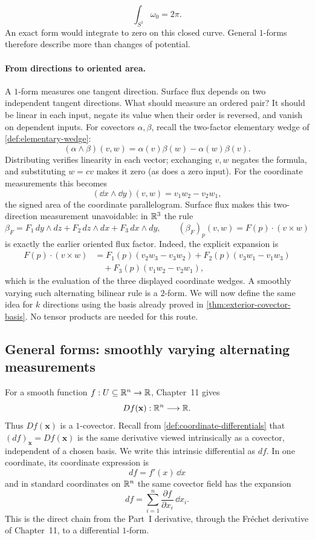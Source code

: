 \[
\int_{S^1}\omega_0=2\pi.
\]
 An exact form would integrate to zero
on this closed curve. General $1$-forms therefore describe more than
changes of potential.

\paragraph{From directions to oriented area.}
A $1$-form measures one tangent direction. Surface flux depends on two
independent tangent directions. What should measure an ordered pair?
It should be linear in each input, negate its value when their order is
reversed, and vanish on dependent inputs. For covectors $\alpha,\beta$,
recall the two-factor elementary wedge of \cref{def:elementary-wedge}:
\[
(\alpha\wedge\beta)(v,w)
=\alpha(v)\beta(w)-\alpha(w)\beta(v).
\]
Distributing verifies linearity in each vector; exchanging $v,w$ negates
the formula, and substituting $w=cv$ makes it zero (as does a zero input).
For the coordinate measurements this becomes
\[
(\dd x\wedge\dd y)(v,w)=v_1w_2-v_2w_1,
\]
the signed area of the coordinate parallelogram. Surface flux makes
this two-direction measurement unavoidable: in $\mathbb{R}^3$ the rule
\[
\beta_F=F_1\,dy\wedge dz+F_2\,dz\wedge dx+F_3\,dx\wedge dy,
\qquad (\beta_F)_p(v,w)=F(p)\cdot(v\times w)
\]
is exactly the earlier oriented flux factor. Indeed, the explicit expansion is
\[
\begin{aligned}
F(p)\cdot(v\times w)
&=F_1(p)(v_2w_3-v_3w_2)+F_2(p)(v_3w_1-v_1w_3)\\
&\quad+F_3(p)(v_1w_2-v_2w_1),
\end{aligned}
\]
which is the evaluation of the three displayed coordinate wedges.
A smoothly varying such
alternating bilinear rule is a $2$-form. We will now define the same idea
for $k$ directions using the basis already proved in
\cref{thm:exterior-covector-basis}. No tensor products are needed for this route.

\subsection{General forms: smoothly varying alternating measurements}

For a smooth function \(f:U\subseteq\mathbb{R}^n\to\mathbb{R}\), Chapter~11 gives
\[
Df(\mathbf{x}):\mathbb{R}^n\longrightarrow\mathbb{R}.
\]
Thus \(Df(\mathbf{x})\) is a \(1\)-covector. Recall from
\cref{def:coordinate-differentials} that \((df)_{\mathbf{x}}=Df(\mathbf{x})\) is the same
derivative viewed intrinsically as a covector, independent of a chosen
basis. We write this intrinsic differential as $df$. In one coordinate,
its coordinate expression is
\[
df=f'(x)\,\dd x
\]
and in standard coordinates on $\mathbb{R}^n$ the same covector field has the
expansion
\[
df=\sum_{i=1}^{n}\frac{\partial f}{\partial x_i}\,\dd x_i.
\]
This is the direct chain from the Part~I derivative, through the
Fr\'echet derivative of Chapter~11, to a differential \(1\)-form.

